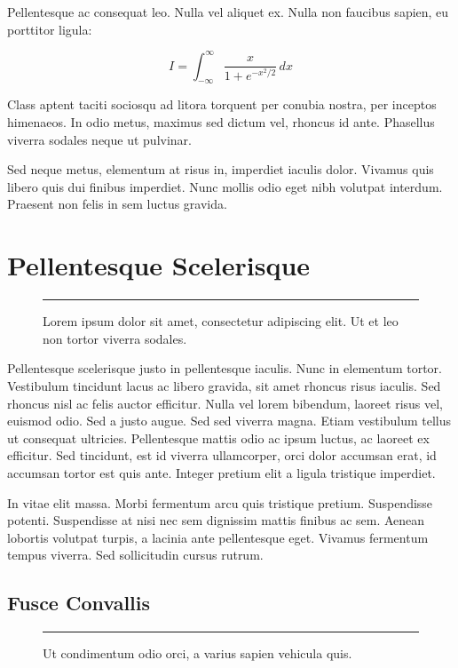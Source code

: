 \documentclass[dissertation]{msudissertation}
\begin{document}
Pellentesque ac consequat leo. Nulla vel aliquet ex. Nulla non faucibus sapien, eu porttitor ligula:

\begin{equation}
  I = \int_{-\infty}^\infty \frac{x}{1 + e^{-x^2 / 2}} \, d x
\end{equation}

Class aptent taciti sociosqu ad litora torquent per conubia nostra, per inceptos himenaeos. In odio metus, maximus sed dictum vel, rhoncus id ante. Phasellus viverra sodales neque ut pulvinar.

Sed neque metus, elementum at risus in, imperdiet iaculis dolor. Vivamus quis libero quis dui finibus imperdiet. Nunc mollis odio eget nibh volutpat interdum. Praesent non felis in sem luctus gravida.

\section{Pellentesque Scelerisque}

\begin{figure}
  \centering
  \rule{6cm}{4cm}
  \caption{Lorem ipsum dolor sit amet, consectetur adipiscing elit. Ut et leo non tortor viverra sodales.}
\end{figure}

Pellentesque scelerisque justo in pellentesque iaculis. Nunc in elementum tortor. Vestibulum tincidunt lacus ac libero gravida, sit amet rhoncus risus iaculis. Sed rhoncus nisl ac felis auctor efficitur. Nulla vel lorem bibendum, laoreet risus vel, euismod odio. Sed a justo augue. Sed sed viverra magna. Etiam vestibulum tellus ut consequat ultricies. Pellentesque mattis odio ac ipsum luctus, ac laoreet ex efficitur. Sed tincidunt, est id viverra ullamcorper, orci dolor accumsan erat, id accumsan tortor est quis ante. Integer pretium elit a ligula tristique imperdiet.

In vitae elit massa. Morbi fermentum arcu quis tristique pretium. Suspendisse potenti. Suspendisse at nisi nec sem dignissim mattis finibus ac sem. Aenean lobortis volutpat turpis, a lacinia ante pellentesque eget. Vivamus fermentum tempus viverra. Sed sollicitudin cursus rutrum. \cite{exampleref1}

\subsection{Fusce Convallis}

\begin{figure}
  \centering
  \rule{5cm}{3cm}
  \caption{Ut condimentum odio orci, a varius sapien vehicula quis.}
\end{figure}
\end{document}
